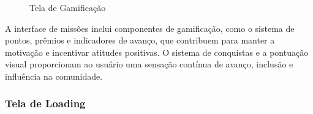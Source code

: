\documentclass[a4paper, 12pt]{article}
\begin{document}
\begin{figure}[H]
  \centering
  \caption{Tela de Gamificação}
  \label{fig:missao}
\end{figure}

A interface de missões inclui componentes de gamificação, como o sistema de pontos, prêmios e indicadores de avanço, que contribuem para manter a motivação e incentivar atitudes positivas.  O sistema de conquistas e a pontuação visual proporcionam ao usuário uma sensação contínua de avanço, inclusão e influência na comunidade.

\subsubsection{Tela de Loading}
\end{document}
